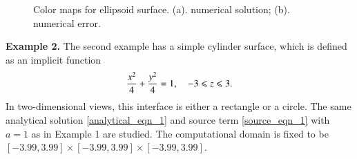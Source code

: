 \documentclass[dissertation]{uathesis}
\begin{document}
\begin{body}
\begin{figure}[!ht]	
	\begin{center}
	\end{center}
	\caption{Color maps for ellipsoid surface. (a). numerical solution; (b). numerical error.}
	\label{fig:color_map_ellipsoid}
\end{figure} 
%


{\flushleft \bf Example 2.} The second example has a simple cylinder surface, which is defined as an implicit function
% 
\begin{equation} \label{cylinder_eq}
\frac{x^{2}}{4}+\frac{y^{2}}{4}=1 , \quad -3\leqslant z \leqslant3. \\
\end{equation}
%
In two-dimensional views, this interface is either a rectangle or a circle. 
The same analytical solution \eqref{analytical_eqn_1} and source term \eqref{source_eqn_1} with $a=1$ as in 
Example 1 are studied. 
The computational domain is fixed to be $[-3.99,3.99]\times[-3.99,3.99]\times[-3.99,3.99]$.


\end{body}
\end{document}
